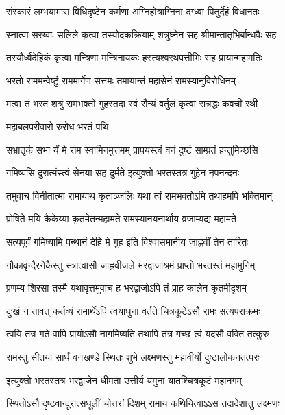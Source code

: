 \twolineshloka
{संस्कारं लम्भयामास विधिदृष्टेन कर्मणा}
{अग्निहोत्राग्निना दग्ध्वा पितुर्देहं विधानतः} %

\twolineshloka
{स्नात्वा सरय्वाः सलिले कृत्वा तस्योदकक्रियाम्}
{शत्रुघ्नेन सह श्रीमान्तातृभिर्बान्धवैः सह} %

\twolineshloka
{तस्यौर्ध्वदेहिकं कृत्वा मन्त्रिणा मन्त्रिनायकः}
{हस्त्यश्वरथपत्तीभिः सह प्रायान्महामतिः} %

\twolineshloka
{भरतो राममन्वेष्टुं राममार्गेण सत्तमः}
{तमायान्तं महासेनं रामस्यानुविरोधिनम्} %

\twolineshloka
{मत्वा तं भरतं शत्रुं रामभक्तो गुहस्तदा}
{स्वं सैन्यं वर्तुलं कृत्वा सन्नद्धः कवची रथी} %

\onelineshloka
{महाबलपरीवारो रुरोध भरतं पथि} %

\twolineshloka
{सभ्रातृकं सभा र्यं मे राम स्वामिनमुत्तमम्}
{प्रापयस्त्वं वनं दुष्टं साम्प्रतं हन्तुमिच्छसि} %

\twolineshloka
{गमिष्यसि दुरात्मंस्त्वं सेनया सह दुर्मते}
{इत्युक्तो भरतस्तत्र गुहेन नृपनन्दनः} %

\twolineshloka
{तमुवाच विनीतात्मा रामायाथ कृताञ्जलिः}
{यथा त्वं रामभक्तोऽमि तथाहमपि भक्तिमान्} %

\twolineshloka
{प्रोषिते मयि कैकेय्या कृतमेतन्महामते}
{रामस्यानयनार्थाय व्रजाम्यद्य महामते} %

\twolineshloka
{सत्यपूर्वं गमिष्यामि पन्थानं देहि मे गुह}
{इति विश्वासमानीय जाह्नवीं तेन तारितः} %

\twolineshloka
{नौकावृन्दैरनेकैस्तु स्त्रात्वासौ जाह्नवीजले}
{भरद्वाजाश्रमं प्राप्तो भरतस्तं महामुनिम्} %

\twolineshloka
{प्रणम्य शिरसा तस्मै यथावृत्तमुवाच ह}
{भरद्वाजोऽपि तं प्राह कालेन कृतमीदृशम्} %

\twolineshloka
{दुःखं न तावत् कर्तव्यं रामार्थेऽपि त्वयाधुना}
{वर्तते चित्रकूटेऽसौ रामः सत्यपराक्रमः} %

\twolineshloka
{त्वयि तत्र गते वापि प्रायोऽसौ नागमिष्यति}
{तथापि तत्र गच्छ त्वं यदसौ वक्ति तत्कुरु} %

\twolineshloka
{रामस्तु सीतया सार्धं वनखण्डे स्थितः शुभे}
{लक्ष्मणस्तु महावीर्यो दुष्टालोकनतत्परः} %

\twolineshloka
{इत्युक्तो भरतस्तत्र भरद्वाजेन धीमता}
{उत्तीर्य यमुनां यातश्चित्रकूटं महानगम्} %

\twolineshloka
{स्थितोऽसौ दृष्टवान्दूरात्सधूलीं चोत्तरां दिशम्}
{रामाय कथियित्वाऽऽस तदादेशात्तु लक्ष्मणः} %

